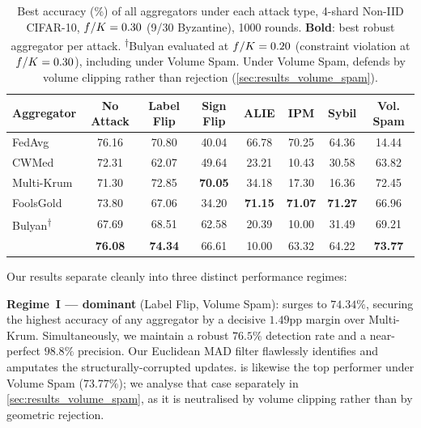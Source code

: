 \documentclass[../main.tex]{subfiles}
\begin{document}
\begin{table}[htbp]
\centering
\caption[Best accuracy (\%) of all aggregators under each attack type, 4-shard Non-IID CIFAR-10, $f/\nclients=0.30$ (9/30 Byzantine), 1000 rounds]{Best accuracy (\%) of all aggregators under each attack type, 4-shard Non-IID CIFAR-10, $f/\nclients=0.30$ (9/30 Byzantine), 1000 rounds. \textbf{Bold}: best robust aggregator per attack. \textsuperscript{$\dagger$}Bulyan evaluated at $f/K=0.20$ (constraint violation at $f/\nclients=0.30$), including under Volume Spam. Under Volume Spam, \aegis{} defends by volume clipping rather than rejection (\cref{sec:results_volume_spam}).}
\label{tab:main_results}
\begin{tabularx}{\linewidth}{Xccccccc}
\toprule
\textbf{Aggregator} & \textbf{No Attack} & \textbf{Label Flip} & \textbf{Sign Flip} & \textbf{ALIE} & \textbf{IPM} & \textbf{Sybil} & \textbf{Vol. Spam} \\
\midrule
FedAvg              & 76.16 & 70.80 & 40.04 & 66.78 & 70.25 & 64.36 & 14.44 \\
CWMed               & 72.31 & 62.07 & 49.64 & 23.21 & 10.43 & 30.58 & 63.82 \\
Multi-Krum          & 71.30 & 72.85 & \textbf{70.05} & 34.18 & 17.30 & 16.36 & 72.45 \\
FoolsGold           & 73.80 & 67.06 & 34.20 & \textbf{71.15} & \textbf{71.07} & \textbf{71.27} & 66.96 \\
Bulyan\textsuperscript{$\dagger$} & 67.69 & 68.51 & 62.58 & 20.39 & 10.00 & 31.49 & 69.21 \\
\midrule
\textbf{\aegis{}}   & \textbf{76.08} & \textbf{74.34} & 66.61 & 10.00 & 63.32 & 64.22 & \textbf{73.77} \\
\bottomrule
\end{tabularx}
\end{table}

Our results separate cleanly into three distinct performance regimes:

\textbf{Regime~I — \aegis{} dominant} (Label Flip, Volume Spam): \aegis{} surges to $74.34\%$, securing the highest accuracy of any aggregator by a decisive $1.49$pp margin over Multi-Krum. Simultaneously, we maintain a robust $76.5\%$ detection rate and a near-perfect $98.8\%$ precision. Our Euclidean MAD filter flawlessly identifies and amputates the structurally-corrupted updates. \aegis{} is likewise the top performer under Volume Spam ($73.77\%$); we analyse that case separately in \cref{sec:results_volume_spam}, as it is neutralised by volume clipping rather than by geometric rejection.
\end{document}
